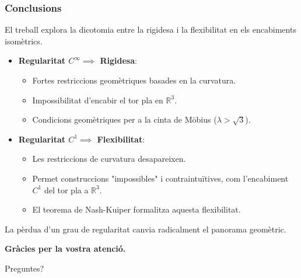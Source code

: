 \documentclass{beamer}
\begin{document}
\begin{frame}
  \frametitle{Conclusions}
  
  El treball explora la dicotomia entre la rigidesa i la flexibilitat en els encabiments isomètrics.
  
  \begin{itemize}
    \item \textbf{Regularitat $C^\infty \implies$ Rigidesa}: 
    \begin{itemize}
        \item Fortes restriccions geomètriques basades en la curvatura.
        \item Impossibilitat d'encabir el tor pla en $\mathbb{R}^3$. 
        \item Condicions geomètriques per a la cinta de Möbius ($\lambda > \sqrt{3}$). 
    \end{itemize}
    
    \vspace{1em}
    
    \item \textbf{Regularitat $C^1 \implies$ Flexibilitat}: 
    \begin{itemize}
        \item Les restriccions de curvatura desapareixen.
        \item Permet construccions "impossibles" i contraintuïtives, com l'encabiment $C^1$ del tor pla a $\mathbb{R}^3$. 
        \item El teorema de Nash-Kuiper formalitza aquesta flexibilitat. 
    \end{itemize}
  \end{itemize}
  
  La pèrdua d'un grau de regularitat canvia radicalment el panorama geomètric.
\end{frame}

\begin{frame}
  \begin{center}
    \Huge\bfseries
    Gràcies per la vostra atenció.
    \vspace{2em}
    
    Preguntes?
  \end{center}
\end{frame}
\end{document}
